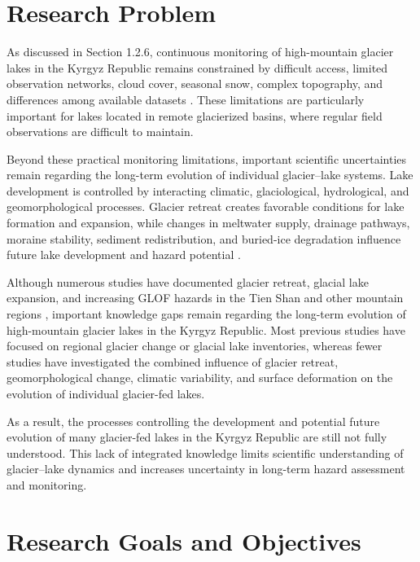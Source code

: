 \documentclass[12pt,a4paper]{report}
\begin{document}
\section{Research Problem}

As discussed in Section 1.2.6, continuous monitoring of high-mountain glacier lakes in the Kyrgyz Republic remains constrained by difficult access, limited observation networks, cloud cover, seasonal snow, complex topography, and differences among available datasets \cite{Bolch2010, Paul2013}. These limitations are particularly important for lakes located in remote glacierized basins, where regular field observations are difficult to maintain.

Beyond these practical monitoring limitations, important scientific uncertainties remain regarding the long-term evolution of individual glacier--lake systems. Lake development is controlled by interacting climatic, glaciological, hydrological, and geomorphological processes. Glacier retreat creates favorable conditions for lake formation and expansion, while changes in meltwater supply, drainage pathways, moraine stability, sediment redistribution, and buried-ice degradation influence future lake development and hazard potential \cite{Emmer2013, Carrivick2013, Veh2020}.

Although numerous studies have documented glacier retreat, glacial lake expansion, and increasing GLOF hazards in the Tien Shan and other mountain regions \cite{Sorg2012, Zaginaev2016, Chen2024, Dehecq2020}, important knowledge gaps remain regarding the long-term evolution of high-mountain glacier lakes in the Kyrgyz Republic. Most previous studies have focused on regional glacier change or glacial lake inventories, whereas fewer studies have investigated the combined influence of glacier retreat, geomorphological change, climatic variability, and surface deformation on the evolution of individual glacier-fed lakes.

As a result, the processes controlling the development and potential future evolution of many glacier-fed lakes in the Kyrgyz Republic are still not fully understood. This lack of integrated knowledge limits scientific understanding of glacier--lake dynamics and increases uncertainty in long-term hazard assessment and monitoring.
 
\section{Research Goals and Objectives}
\end{document}

